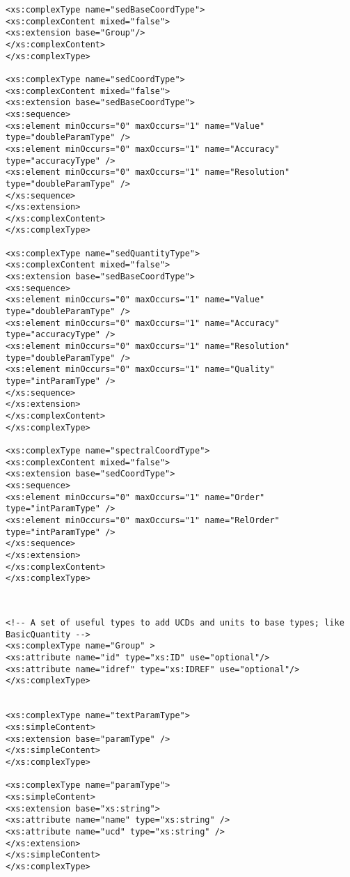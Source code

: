 {\begin{flushleft}
\begin{fmppage}
\begin{verbatim}
<xs:complexType name="sedBaseCoordType">
<xs:complexContent mixed="false">
<xs:extension base="Group"/>
</xs:complexContent>
</xs:complexType>

<xs:complexType name="sedCoordType">
<xs:complexContent mixed="false">
<xs:extension base="sedBaseCoordType">
<xs:sequence>
<xs:element minOccurs="0" maxOccurs="1" name="Value" type="doubleParamType" />
<xs:element minOccurs="0" maxOccurs="1" name="Accuracy" type="accuracyType" />
<xs:element minOccurs="0" maxOccurs="1" name="Resolution" type="doubleParamType" />
</xs:sequence>
</xs:extension>
</xs:complexContent>
</xs:complexType>

<xs:complexType name="sedQuantityType">
<xs:complexContent mixed="false">
<xs:extension base="sedBaseCoordType">
<xs:sequence>
<xs:element minOccurs="0" maxOccurs="1" name="Value" type="doubleParamType" />
<xs:element minOccurs="0" maxOccurs="1" name="Accuracy" type="accuracyType" />
<xs:element minOccurs="0" maxOccurs="1" name="Resolution" type="doubleParamType" />
<xs:element minOccurs="0" maxOccurs="1" name="Quality" type="intParamType" />
</xs:sequence>
</xs:extension>
</xs:complexContent>
</xs:complexType>

<xs:complexType name="spectralCoordType">
<xs:complexContent mixed="false">
<xs:extension base="sedCoordType">
<xs:sequence>
<xs:element minOccurs="0" maxOccurs="1" name="Order" type="intParamType" />
<xs:element minOccurs="0" maxOccurs="1" name="RelOrder" type="intParamType" />
</xs:sequence>
</xs:extension>
</xs:complexContent>
</xs:complexType>


\end{verbatim}
\end{fmppage}

\begin{fmppage}
\begin{verbatim}

<!-- A set of useful types to add UCDs and units to base types; like BasicQuantity -->
<xs:complexType name="Group" >
<xs:attribute name="id" type="xs:ID" use="optional"/>
<xs:attribute name="idref" type="xs:IDREF" use="optional"/>
</xs:complexType>


<xs:complexType name="textParamType">
<xs:simpleContent>
<xs:extension base="paramType" />
</xs:simpleContent>
</xs:complexType>

<xs:complexType name="paramType">
<xs:simpleContent>
<xs:extension base="xs:string">
<xs:attribute name="name" type="xs:string" />
<xs:attribute name="ucd" type="xs:string" />
</xs:extension>
</xs:simpleContent>
</xs:complexType>


\end{verbatim}
\end{fmppage}
\end{flushleft}}
